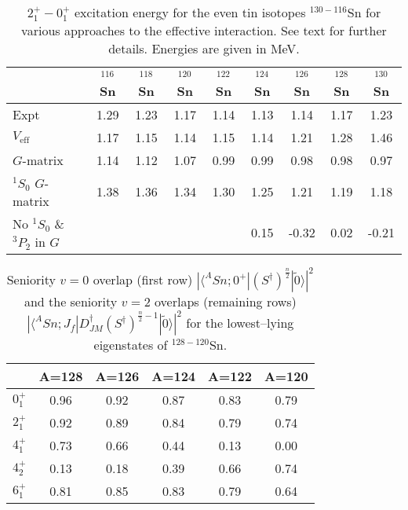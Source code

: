 \documentclass[preprint,rmp,aps,floatfix]{revtex4}
\begin{document}
\newpage


\begin{table}[hbt]
\begin{center}
\caption{ $2^+_1-0^+_1$ excitation energy for the 
even tin isotopes $^{130-116}$Sn for various approaches
to the effective interaction. See text for further details. 
Energies are given in MeV. \label{tab:table_tincalc1}}
\begin{tabular}{lcccccccc}\hline
 & {$^{116}$Sn} & {$^{118}$Sn} & {$^{120}$Sn} &{$^{122}$Sn} & {$^{124}$Sn} & {$^{126}$Sn} & {$^{128}$Sn} & {$^{130}$Sn} \\ \hline
Expt & 1.29 & 1.23 & 1.17 & 1.14 & 1.13 & 1.14 & 1.17 & 1.23 \\
$V_{\mathrm{eff}}$ & 1.17 & 1.15 & 1.14 & 1.15 & 1.14 & 1.21 & 1.28 & 1.46 \\
$G$-matrix &1.14 & 1.12& 1.07 & 0.99 & 0.99 & 0.98 & 0.98 & 0.97  \\
$^1S_0$ $G$-matrix &1.38 &1.36 &1.34 &1.30 & 1.25& 1.21 &1.19 &1.18 \\
No $^1S_0$ \& $^3P_2$ in $G$ &     &     &     &      &0.15 &-0.32 &0.02 &-0.21  \\\hline
\end{tabular}
\end{center}
\end{table}


\begin{table}[htbp]
\caption{ Seniority $v=0$ overlap (first row)  
         $|\langle ^{A}Sn;0^{+}|(S^{\dagger})^{\frac{n}{2}}| 
         \tilde{0} \rangle |^{2}$ and the seniority $v=2$ 
         overlaps (remaining rows) $|\langle ^{A}Sn ;J_{f}|
         D^{\dagger}_{JM}(S^{\dagger})^{\frac{n}{2} - 1}| 
         \tilde{0} \rangle |^{2}$ for the lowest--lying eigenstates 
         of $^{128-120}$Sn.\label{tab:seniority}}
\begin{center}
\begin{tabular}{cccccc}
\hline
 & A=128 & A=126 & A=124 & A=122 & A=120 \\ 
\hline
$0^{+}_{1}$ & 0.96 & 0.92 & 0.87 & 0.83 & 0.79 \\ 
$2^{+}_{1}$ & 0.92 & 0.89 & 0.84 & 0.79 & 0.74 \\ 
$4^{+}_{1}$ & 0.73 & 0.66 & 0.44 & 0.13 & 0.00 \\ 
$4^{+}_{2}$ & 0.13 & 0.18 & 0.39 & 0.66 & 0.74 \\
$6^{+}_{1}$ & 0.81 & 0.85 & 0.83 & 0.79 & 0.64 \\
\hline
\end{tabular}
\end{center}
\end{table}
\end{document}
